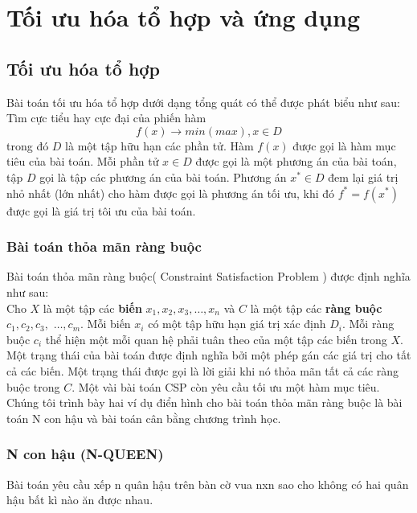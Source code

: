 \documentclass[a4paper,12pt]{report}
\begin{document}
\section{Tối ưu hóa tổ hợp và ứng dụng}
\label{section:cbo}
\subsection{Tối ưu hóa tổ hợp}
Bài toán tối ưu hóa tổ hợp dưới dạng tổng quát có thể được phát biểu như sau: \\

Tìm cực tiểu hay cực đại của phiến hàm $$f(x)\rightarrow min(max), x \in D$$ trong đó $D$ là một tập hữu hạn các phần tử. Hàm $f(x)$ được gọi là hàm mục tiêu của bài toán. Mỗi phần tử $x\in D$ được gọi là một phương án của bài toán, tập $D$ gọi là tập các phương án của bài toán. Phương án $x^* \in D$ đem lại giá trị nhỏ nhất (lớn nhất) cho hàm được gọi là phương án tối ưu, khi đó $f^*=f(x^*)$ được gọi là giá trị tôi ưu của bài toán\cite{TRR}.
\subsubsection{Bài toán thỏa mãn ràng buộc}
Bài toán thỏa mãn ràng buộc( Constraint Satisfaction
Problem ) được định nghĩa như sau:\\
Cho $X$ là một tập các \textbf{biến} $x_1, x_2, x_3, \ldots, x_n$ và $C$ là một tập các \textbf{ràng buộc} $c_1, c_2, c_3,$ $ 
\ldots, c_m$. Mỗi biến $x_i$ có một tập hữu hạn giá trị xác định $D_i$. Mỗi ràng buộc $c_i$ thể hiện một mỗi quan hệ phải tuân theo của một tập các biến trong $X$. Một trạng thái của bài toán được định nghĩa bởi một phép gán các giá trị cho tất cả các biến. Một trạng thái được gọi là lời giải khi nó thỏa mãn tất cả các ràng buộc trong $C$. Một vài bài toán \ac{CSP} còn yêu cầu tối ưu một hàm mục tiêu. \cite{AIAMAB} \cite{slidethayquang} \\

Chúng tôi trình bày hai ví dụ điển hình cho bài toán thỏa mãn ràng buộc là bài toán N con hậu và bài toán cân bằng chương trình học.
\subsubsection{N con hậu (N-QUEEN)}
Bài toán yêu cầu xếp n quân hậu trên bàn cờ vua nxn sao cho không có hai quân hậu bất kì nào ăn được nhau.
\end{document}

